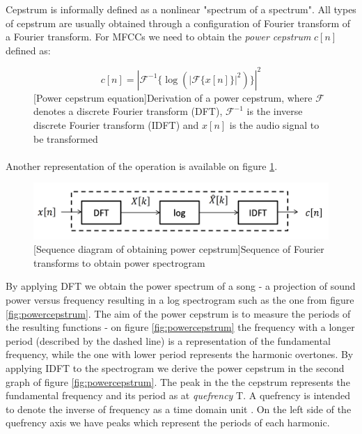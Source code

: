 Cepstrum is informally defined as a nonlinear "spectrum of a spectrum". All
types of cepstrum are usually obtained through a configuration of Fourier
transform of a Fourier transform. For MFCCs we need to obtain the \textit{power
cepstrum} $c[n]$ defined as:
\begin{figure}[H]
    \begin{equation}
        c[n] = |\mathcal{F}^{-1}\{\log{}(|\mathcal{F}\{ x[n]\}|^2)\}|^2
    \end{equation}
    [Power cepstrum equation]{Derivation of a power cepstrum, where $\mathcal{F}$ denotes a discrete Fourier transform (DFT), $\mathcal{F}^{-1}$ is the inverse discrete Fourier transform (IDFT) and $x[n]$ is the audio signal to be transformed \cite{wiki:cepstrum}}
\end{figure}

\paragraph{}
Another representation of the operation is available on figure \ref{fig:powerspectrumsequence}.

\begin{figure}[H]
    \centering
    \includegraphics[width=\textwidth]{Algorithms/powercepstrum.png}
    [Sequence diagram of obtaining power cepstrum]{Sequence of Fourier transforms to obtain power spectrogram \cite{cepstrumgraph}}
    \label{fig:powerspectrumsequence}
\end{figure}

By applying DFT we obtain the power spectrum of a song - a projection of sound
power versus frequency resulting in a log spectrogram such as the one from
figure \ref{fig:powercepstrum}. The aim of the power cepstrum is to measure the
periods of the resulting functions - on figure \ref{fig:powercepstrum} the
frequency with a longer period (described by the dashed line) is a
representation of the fundamental frequency, while the one with lower period
represents the harmonic overtones. By applying IDFT to the spectrogram we derive
the power cepstrum in the second graph of figure \ref{fig:powercepstrum}. The
peak in the the cepstrum represents the fundamental frequency and its period as
at \textit{quefrency} T. A quefrency is intended to denote the inverse of
frequency as a time domain unit \cite{cepstralanalysis}. On the left side of the
quefrency axis we have peaks which represent the periods of each harmonic.

